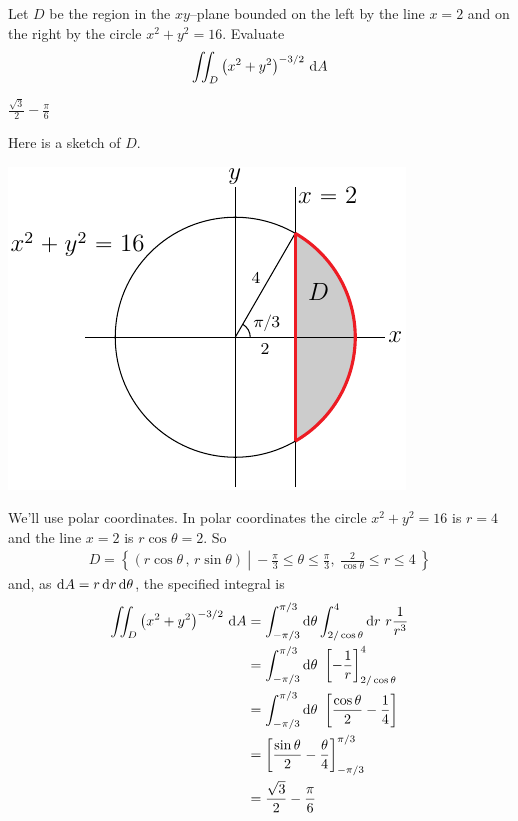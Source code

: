 \begin{question}[M200 2014A] %
Let $D$ be the region in the $xy$--plane bounded on the left by the line 
$x = 2$ and on the right by the circle $x^2 + y^2 = 16$. Evaluate
\begin{equation*}
\dblInt_D\big(x^2+y^2\big)^{-3/2}\ \dee{A}
\end{equation*}
\end{question}

%

\begin{answer}
$\frac{\sqrt{3}}{2}-\frac{\pi}{6}$
\end{answer}

\begin{solution}
Here is a sketch of $D$.

\begin{center}
     \includegraphics{fig/OE14A_5.pdf}
\end{center}

We'll use polar coordinates. In polar coordinates the circle $x^2+y^2=16$
is $r=4$ and the line $x=2$ is $r\cos\theta =2$. So
\begin{align*}
D = \left\{(r\cos\theta\,,\,r\sin\theta)\ \left|\ 
           -\frac{\pi}{3}\le\theta\le\frac{\pi}{3},\ 
           \frac{2}{\cos\theta}\le r\le 4\ \right.\right\}
\end{align*}
and, as $\mathrm{d}A = r\,\mathrm{d}r\,\mathrm{d}\theta$, the specified integral is
\begin{align*}
\dblInt_D\big(x^2+y^2\big)^{-3/2}\ \dee{A}
&= \int_{-\pi/3}^{\pi/3} \dee{\theta}\int_{2/\cos\theta}^4\dee{r}\ 
           r\frac{1}{r^3} \\
&= \int_{-\pi/3}^{\pi/3} \dee{\theta}\ 
           \left[-\frac{1}{r}\right]_{2/\cos\theta}^4 \\
&= \int_{-\pi/3}^{\pi/3} \dee{\theta}\ 
           \left[\frac{\cos\theta}{2}-\frac{1}{4}\right] \\
&=  \left[\frac{\sin\theta}{2}-\frac{\theta}{4}\right]_{-\pi/3}^{\pi/3} \\
&=\frac{\sqrt{3}}{2}-\frac{\pi}{6}
\end{align*}
\end{solution}

